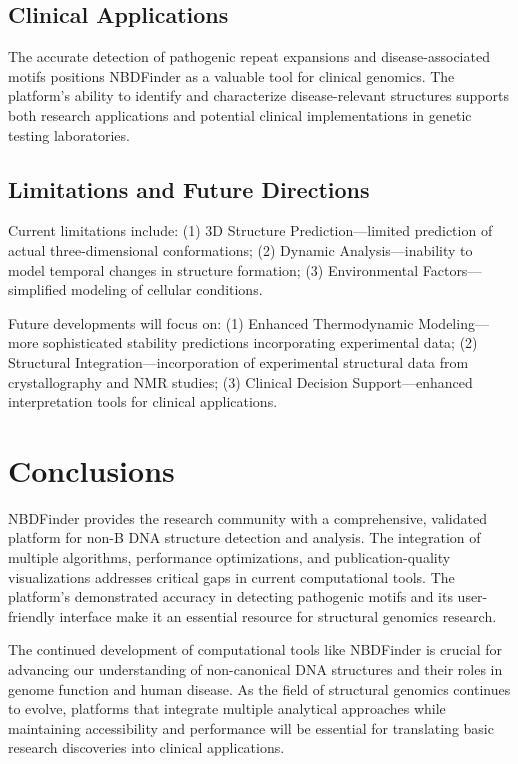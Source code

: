 \documentclass[twocolumn,letterpaper]{article}
\begin{document}
\subsection{Clinical Applications}

The accurate detection of pathogenic repeat expansions and disease-associated motifs positions NBDFinder as a valuable tool for clinical genomics. The platform's ability to identify and characterize disease-relevant structures supports both research applications and potential clinical implementations in genetic testing laboratories.

\subsection{Limitations and Future Directions}

Current limitations include: (1) 3D Structure Prediction—limited prediction of actual three-dimensional conformations; (2) Dynamic Analysis—inability to model temporal changes in structure formation; (3) Environmental Factors—simplified modeling of cellular conditions.

Future developments will focus on: (1) Enhanced Thermodynamic Modeling—more sophisticated stability predictions incorporating experimental data; (2) Structural Integration—incorporation of experimental structural data from crystallography and NMR studies; (3) Clinical Decision Support—enhanced interpretation tools for clinical applications.

\section{Conclusions}

NBDFinder provides the research community with a comprehensive, validated platform for non-B DNA structure detection and analysis. The integration of multiple algorithms, performance optimizations, and publication-quality visualizations addresses critical gaps in current computational tools. The platform's demonstrated accuracy in detecting pathogenic motifs and its user-friendly interface make it an essential resource for structural genomics research.

The continued development of computational tools like NBDFinder is crucial for advancing our understanding of non-canonical DNA structures and their roles in genome function and human disease. As the field of structural genomics continues to evolve, platforms that integrate multiple analytical approaches while maintaining accessibility and performance will be essential for translating basic research discoveries into clinical applications.
\end{document}
